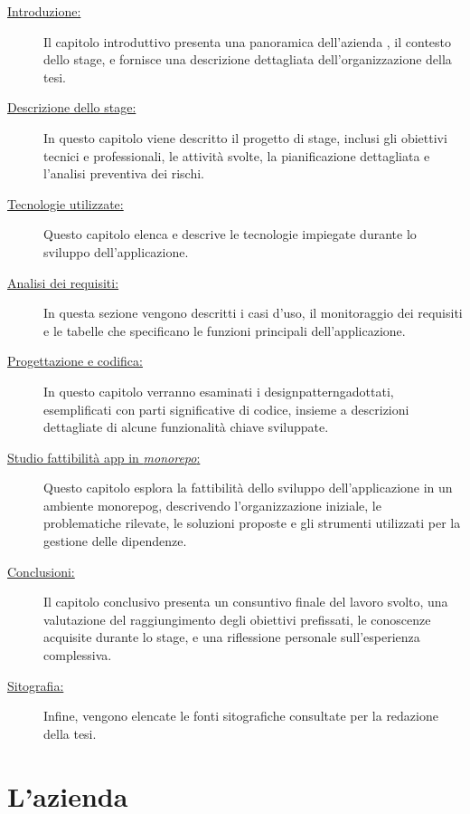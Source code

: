 \begin{description}
    \item[{\hyperref[chap:introduzione]{Introduzione:}}] Il capitolo introduttivo presenta una panoramica dell'azienda \myAzienda, il contesto dello stage, e fornisce una descrizione dettagliata dell'organizzazione della tesi.
    \item[{\hyperref[chap:stage_descrizione]{Descrizione dello stage:}}] In questo capitolo viene descritto il progetto di stage, inclusi gli obiettivi tecnici e professionali, le attività svolte, la pianificazione dettagliata e l'analisi preventiva dei rischi.
    \item[{\hyperref[chap:tecnologie_utilizzate]{Tecnologie utilizzate:}}] Questo capitolo elenca e descrive le tecnologie impiegate durante lo sviluppo dell'applicazione.
    \item[{\hyperref[chap:analisi_requisiti]{Analisi dei requisiti:}}] In questa sezione vengono descritti i casi d'uso, il monitoraggio dei requisiti e le tabelle che specificano le funzioni principali dell'applicazione.
    \item[{\hyperref[chap:design_coding]{Progettazione e codifica:}}] In questo capitolo verranno esaminati i \gls{designpatterng}\glox adottati, esemplificati con parti significative di codice, insieme a descrizioni dettagliate di alcune funzionalità chiave sviluppate.
    \item[{\hyperref[chap:studio_fattibilita]{Studio fattibilità app in \textit{monorepo}:}}] Questo capitolo esplora la fattibilità dello sviluppo dell'applicazione in un ambiente \gls{monorepog}\glox, descrivendo l'organizzazione iniziale, le problematiche rilevate, le soluzioni proposte e gli strumenti utilizzati per la gestione delle dipendenze.
    \item[{\hyperref[chap:conclusioni]{Conclusioni:}}] Il capitolo conclusivo presenta un consuntivo finale del lavoro svolto, una valutazione del raggiungimento degli obiettivi prefissati, le conoscenze acquisite durante lo stage, e una riflessione personale sull'esperienza complessiva.
    \item[{\hyperref[cap:webliography]{Sitografia:}}] Infine, vengono elencate le fonti sitografiche consultate per la redazione della tesi.
\end{description}
\pagebreak
\section{L'azienda}

